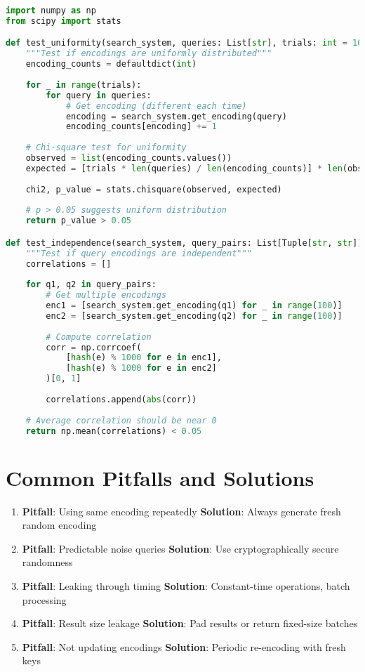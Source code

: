 \begin{lstlisting}[language=Python, caption={Testing privacy properties}]
import numpy as np
from scipy import stats

def test_uniformity(search_system, queries: List[str], trials: int = 1000):
    """Test if encodings are uniformly distributed"""
    encoding_counts = defaultdict(int)
    
    for _ in range(trials):
        for query in queries:
            # Get encoding (different each time)
            encoding = search_system.get_encoding(query)
            encoding_counts[encoding] += 1
    
    # Chi-square test for uniformity
    observed = list(encoding_counts.values())
    expected = [trials * len(queries) / len(encoding_counts)] * len(observed)
    
    chi2, p_value = stats.chisquare(observed, expected)
    
    # p > 0.05 suggests uniform distribution
    return p_value > 0.05

def test_independence(search_system, query_pairs: List[Tuple[str, str]]):
    """Test if query encodings are independent"""
    correlations = []
    
    for q1, q2 in query_pairs:
        # Get multiple encodings
        enc1 = [search_system.get_encoding(q1) for _ in range(100)]
        enc2 = [search_system.get_encoding(q2) for _ in range(100)]
        
        # Compute correlation
        corr = np.corrcoef(
            [hash(e) % 1000 for e in enc1],
            [hash(e) % 1000 for e in enc2]
        )[0, 1]
        
        correlations.append(abs(corr))
    
    # Average correlation should be near 0
    return np.mean(correlations) < 0.05
\end{lstlisting}

\section{Common Pitfalls and Solutions}

\begin{enumerate}
\item \textbf{Pitfall}: Using same encoding repeatedly
   \textbf{Solution}: Always generate fresh random encoding

\item \textbf{Pitfall}: Predictable noise queries
   \textbf{Solution}: Use cryptographically secure randomness

\item \textbf{Pitfall}: Leaking through timing
   \textbf{Solution}: Constant-time operations, batch processing

\item \textbf{Pitfall}: Result size leakage
   \textbf{Solution}: Pad results or return fixed-size batches

\item \textbf{Pitfall}: Not updating encodings
   \textbf{Solution}: Periodic re-encoding with fresh keys
\end{enumerate}

